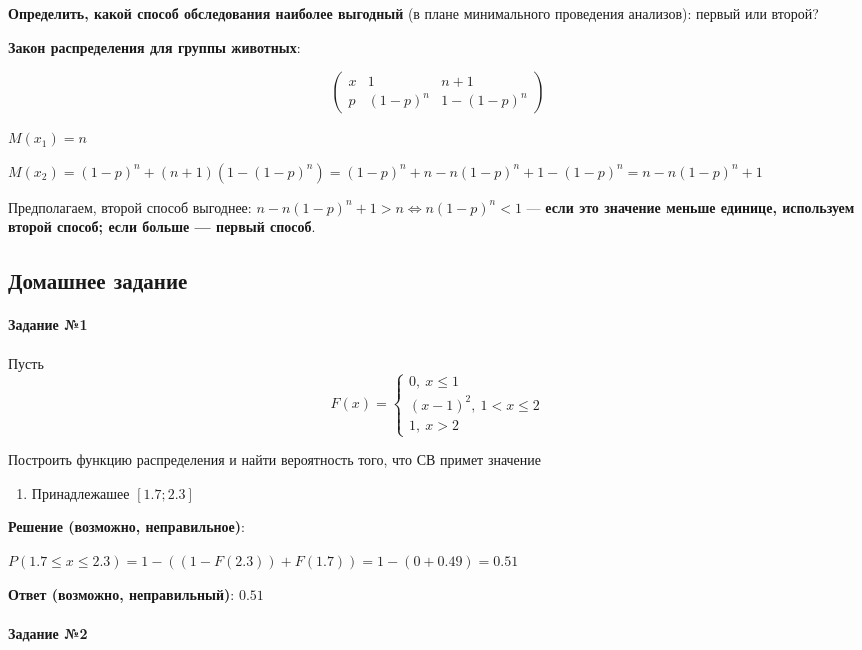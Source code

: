 \documentclass{article}
\begin{document}
\textbf{Определить, какой способ обследования наиболее выгодный} (в плане минимального проведения анализов): первый или второй?

\textbf{Закон распределения для группы животных}:

$$
\begin{pmatrix}
    x & 1 & n + 1 \\
    p & (1-p)^{n} & 1 - (1-p)^{n} 
\end{pmatrix}
$$

$M(x_1) = n$

$M(x_2) = (1-p)^{n} + (n + 1)(1 - (1-p)^{n}) = (1-p)^{n} + n - n(1-p)^{n} + 1 - (1-p)^{n} = n - n(1-p)^{n} + 1$

Предполагаем, второй способ выгоднее: $n - n(1-p)^{n} + 1 > n \Longleftrightarrow n(1-p)^{n} < 1$ — \textbf{если это значение меньше единице, используем второй способ; если больше — первый способ}.

\subsection{Домашнее задание}

\paragraph{Задание №1}

Пусть $$F(x) = \begin{cases}
    0, \ x \le 1 \\
    (x - 1)^2, \ 1 < x \le 2 \\
    1, \ x > 2
\end{cases}
$$

Построить функцию распределения и найти вероятность того, что СВ примет значение

\begin{multicols}{2}
    \begin{enumerate}
        \item Принадлежашее $[1.7; 2.3]$
    \end{enumerate}    
\end{multicols}

\textbf{Решение (возможно, неправильное)}:

$P(1.7 \le x \le 2.3) = 1 - ((1 - F(2.3)) + F(1.7)) = 1 - (0 + 0.49) = 0.51$

\textbf{Ответ (возможно, неправильный)}: $0.51$

\paragraph{Задание №2}
\end{document}
